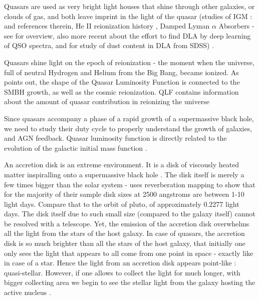 \documentclass[modern]{aastex62}
\begin{document}
Quasars are used as very bright light houses that shine through other galaxies, or clouds of gas, and both leave imprint in the light of the quasar  (studies of IGM : \cite{prochaska2014} and references therein,  He II reionization history \cite{khrykin2017} , Damped Lyman $\alpha$ Absorbers - see \cite{wolfe2005} for overview, also more recent \cite{parks2018} about the effort to find DLA by deep learning of QSO spectra, and \cite{murphy2016} for study of  dust content in DLA from SDSS) .  

Quasars shine light on the epoch of reionization - the moment when the universe, full of neutral Hydrogen and Helium from the Big Bang, became ionized. As  \cite{alsayyad2016} points out, the shape of the Quasar Luminosity Function is connected to the SMBH growth, as well as the cosmic reionization. QLF contains information about the amount of quasar contribution in reionizing the universe \citep{glikman2011, masters2012, ross2013}






Since quasars accompany a phase of a rapid growth of a supermassive black hole, we need to study their duty cycle to properly understand the growth of galaxies, and AGN feedback. Quasar luminosity function is directly related to the evolution of the galactic initial mass function \citep{mcgreer2013}. 

An accretion disk is an extreme environment. It is a disk of viscously heated matter inspiralling onto a supermassive black hole \citep{ruan2017}. The disk itself is merely a few times bigger than  the solar system -  \citep{mudd2017} uses reverberation mapping to show that for the majority of their sample disk sizes at 2500 angstroms are between 1-10 light days. Compare that to the orbit of pluto, of approximately 0.2277 light days. The disk itself due to such small size (compared to the galaxy itself) cannot be resolved with a telescope.  Yet, the emission of the accretion disk overwhelms all the light from the stars of the host galaxy.   In case of quasars, the accretion disk is so much brighter than all the stars of the host galaxy, that initially one only sees the light that appears to all come from one point in space - exactly like in case of a star. Hence the light from an accretion disk appears point-like : quasi-stellar. However,  if one allows to collect the light for much longer, with bigger collecting area  we begin to see the stellar light from the galaxy hosting the active nucleus \citep{hutchings2002,kotilainen2013, falomo2014, liuzzo2016, bayliss2017}. 
\end{document}
